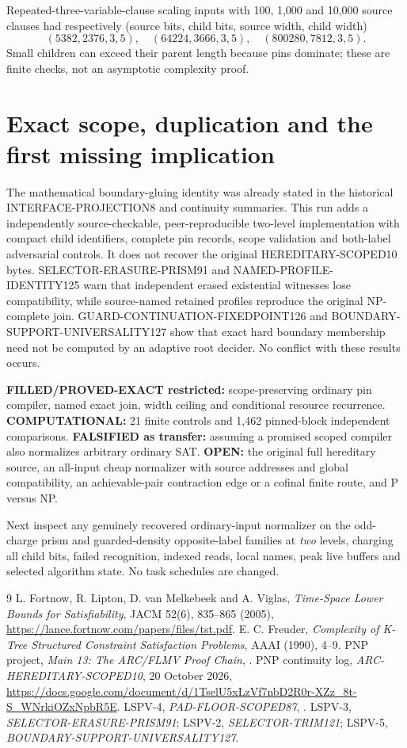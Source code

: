\documentclass[11pt]{article}
\begin{document}
Repeated-three-variable-clause scaling inputs with 100, 1,000 and 10,000 source clauses had respectively (source bits, child bits, source width, child width)
\[
 (5382,2376,3,5),\quad(64224,3666,3,5),\quad
 (800280,7812,3,5).
\]
Small children can exceed their parent length because pins dominate; these are finite checks, not an asymptotic complexity proof.

\section{Exact scope, duplication and the first missing implication}
The mathematical boundary-gluing identity was already stated in the historical INTERFACE-PROJECTION8 and continuity summaries. This run adds a independently source-checkable, peer-reproducible two-level implementation with compact child identifiers, complete pin records, scope validation and both-label adversarial controls. It does not recover the original HEREDITARY-SCOPED10 bytes. SELECTOR-ERASURE-PRISM91 and NAMED-PROFILE-IDENTITY125 warn that independent erased existential witnesses lose compatibility, while source-named retained profiles reproduce the original NP-complete join. GUARD-CONTINUATION-FIXEDPOINT126 and BOUNDARY-SUPPORT-UNIVERSALITY127 show that exact hard boundary membership need not be computed by an adaptive root decider. No conflict with these results occurs.

\textbf{FILLED/PROVED-EXACT restricted:} scope-preserving ordinary pin compiler, named exact join, width ceiling and conditional resource recurrence. \textbf{COMPUTATIONAL:} 21 finite controls and 1,462 pinned-block independent comparisons. \textbf{FALSIFIED as transfer:} assuming a promised scoped compiler also normalizes arbitrary ordinary SAT. \textbf{OPEN:} the original full hereditary source, an all-input cheap normalizer with source addresses and global compatibility, an achievable-pair contraction edge or a cofinal finite route, and P versus NP.

Next inspect any genuinely recovered ordinary-input normalizer on the odd-charge prism and guarded-density opposite-label families at \emph{two} levels, charging all child bits, failed recognition, indexed reads, local names, peak live buffers and selected algorithm state. No task schedules are changed.

\begin{thebibliography}{9}
 L. Fortnow, R. Lipton, D. van Melkebeek and A. Viglas, \emph{Time-Space Lower Bounds for Satisfiability}, JACM 52(6), 835--865 (2005), \url{https://lance.fortnow.com/papers/files/tst.pdf}.
 E. C. Freuder, \emph{Complexity of K-Tree Structured Constraint Satisfaction Problems}, AAAI (1990), 4--9.
 PNP project, \emph{Main 13: The ARC/FLMV Proof Chain}, .
 PNP continuity log, \emph{ARC-HEREDITARY-SCOPED10}, 20 October 2026, \url{https://docs.google.com/document/d/1TselU5xLzVf7nbD2R0r-XZz_8t-S_WNrkiOZxNpbR5E}.
 LSPV-4, \emph{PAD-FLOOR-SCOPED87}, .
 LSPV-3, \emph{SELECTOR-ERASURE-PRISM91}; LSPV-2, \emph{SELECTOR-TRIM121}; LSPV-5, \emph{BOUNDARY-SUPPORT-UNIVERSALITY127}.
\end{thebibliography}
\end{document}
